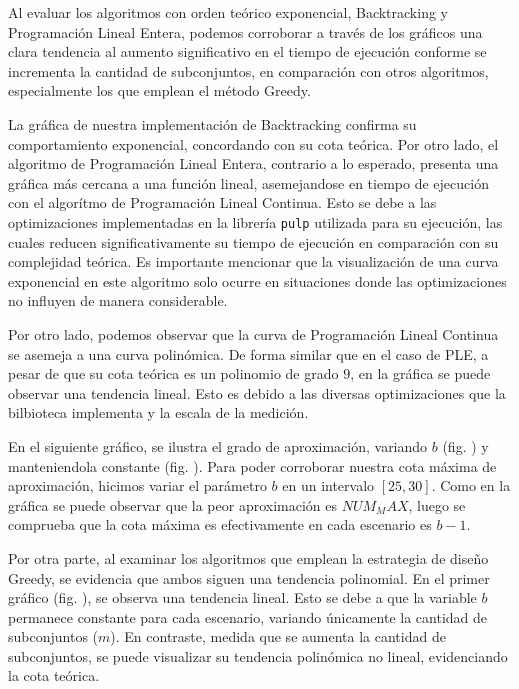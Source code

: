 Al evaluar los algoritmos con orden teórico exponencial, Backtracking y Programación Lineal Entera, podemos corroborar a través de los gráficos una clara tendencia al aumento significativo en el tiempo de ejecución conforme se incrementa la cantidad de subconjuntos, en comparación con otros algoritmos, especialmente los que emplean el método Greedy.

La gráfica de nuestra implementación de Backtracking confirma su comportamiento exponencial, concordando con su cota teórica. Por otro lado, el algoritmo de Programación Lineal Entera, contrario a lo esperado, presenta una gráfica más cercana a una función lineal, asemejandose en tiempo de ejecución con el algorítmo de Programación Lineal Continua. Esto se debe a las optimizaciones implementadas en la librería \texttt{pulp} utilizada para su ejecución, las cuales reducen significativamente su tiempo de ejecución en comparación con su complejidad teórica. Es importante mencionar que la visualización de una curva exponencial en este algoritmo solo ocurre en situaciones donde las optimizaciones no influyen de manera considerable.

Por otro lado, podemos observar que la curva de Programación Lineal Continua se asemeja a una curva polinómica. De forma similar que en el caso de PLE, a pesar de que su cota teórica es un polinomio de grado $9$, en la gráfica se puede observar una tendencia lineal. Esto es debido a las diversas optimizaciones que la bilbioteca implementa y la escala de la medición.

En el siguiente gráfico, se ilustra el grado de aproximación, variando $b$ (fig. \label{medicion-plc-var-b}) y manteniendola constante (fig. \label{medicion-plc-cons-b}). Para poder corroborar nuestra cota máxima de aproximación, hicimos variar el parámetro $b$ en un intervalo $\left[25,30\right]$. Como en la gráfica se puede observar que la peor aproximación es $NUM_MAX$, luego se comprueba que la cota máxima es efectivamente en cada escenario es $b-1$.

Por otra parte, al examinar los algoritmos que emplean la estrategia de diseño Greedy, se evidencia que ambos siguen una tendencia polinomial. En el primer gráfico (fig. \label {imagen}), se observa una tendencia lineal. Esto se debe a que la variable $b$ permanece constante para cada escenario, variando únicamente la cantidad de subconjuntos ($m$). En contraste, medida que se aumenta la cantidad de subconjuntos, se puede visualizar su tendencia polinómica no lineal, evidenciando la cota teórica. 


